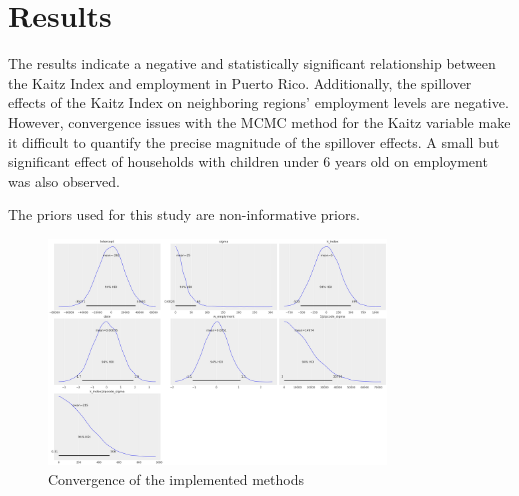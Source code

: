 \documentclass[AEJ]{AEA}
\begin{document}
\section{Results}

The results indicate a negative and statistically significant relationship between the Kaitz Index and employment in Puerto Rico. Additionally, the spillover effects of the Kaitz Index on neighboring regions’ employment levels are negative. However, convergence issues with the MCMC method for the Kaitz variable make it difficult to quantify the precise magnitude of the spillover effects. A small but significant effect of households with children under 6 years old on employment was also observed.

The priors used for this study are non-informative priors.

\begin{figure}[htbp]
	\centering
	\includegraphics[width=0.8\textwidth]{priori.png}
	\caption{Convergence of the implemented methods}
\end{figure}
\end{document}
